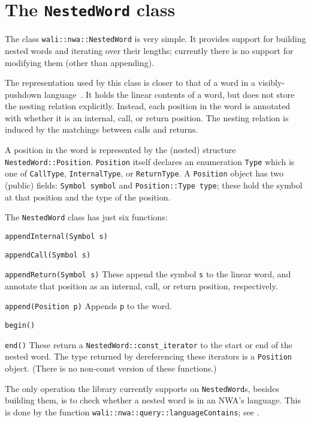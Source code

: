 \section{The \texttt{NestedWord} class}
\label{Se:class-nested-word}

The class \texttt{wali::nwa::NestedWord} is very simple. It provides support for
building nested words and iterating over their lengths; currently there
is no support for modifying them (other than appending).

The representation used by this class is closer to that of a word in a
visibly-pushdown language~\cite{JACM:AM2009}. It holds the linear contents of
a word, but does not store the nesting relation explicitly. Instead, each
position in the word is annotated with whether it is an internal, call, or
return position. The nesting relation is induced by the matchings between
calls and returns.

A position in the word is represented by the (nested) structure
\texttt{NestedWord::Position}. \texttt{Position} itself declares an
enumeration \texttt{Type} which is one of \texttt{CallType},
\texttt{InternalType}, or \texttt{ReturnType}.
A \texttt{Position} object has two (public) fields: \texttt{Symbol symbol}
and \texttt{Position::Type type}; these hold the symbol at that position and
the type of the position.


The \texttt{NestedWord} class has just six functions:
\begin{description}
  \item\texttt{appendInternal(Symbol s)}
  \item\texttt{appendCall(Symbol s)}
  \item\texttt{appendReturn(Symbol s)}
    These append the symbol \texttt{s} to the linear word, and annotate that
    position as an internal, call, or return position, respectively.
  \item\texttt{append(Position p)}
    Appends \texttt{p} to the word.
  \item\texttt{begin()}
  \item\texttt{end()}
    These return a \texttt{NestedWord::const\_iterator} to the start or end
    of the nested word. The type returned by dereferencing these iterators is
    a \texttt{Position} object. (There is no non-const version of these
    functions.)
\end{description}

The only operation the library currently supports on
\texttt{NestedWord}s, besides building them, is to check whether a
nested word is in an NWA's language. This is done by the function
\texttt{wali::nwa::query::languageContains}; see
.

